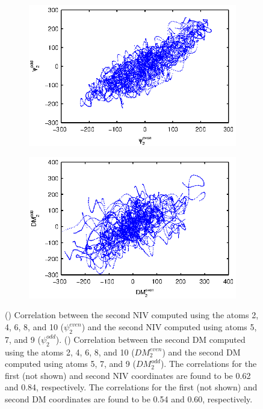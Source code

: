 \begin{figure}[t]
\centering
\begin{subfigure}{0.4\textwidth}
\includegraphics[width=\textwidth]{NLICA_corr}
\caption{}
\label{subfig:ala_corr1}
\end{subfigure}
\begin{subfigure}{0.4\textwidth}
\includegraphics[width=\textwidth]{DM_corr}
\caption{}
\label{subfig:ala_corr2}
\end{subfigure}
\caption[Comparison of intrinsic variable and diffusion maps embeddings for alanine dipeptide data]{() Correlation between the second NIV computed using the atoms 2, 4, 6, 8, and 10 ($\psi_2^{even}$) and the second NIV computed using atoms 5, 7, and 9 ($\psi_2^{odd}$).
    () Correlation between the second DM computed using the atoms 2, 4, 6, 8, and 10 ($DM_2^{even}$) and the second DM computed using atoms 5, 7, and 9 ($DM_2^{odd}$).
    The correlations for the first (not shown) and second NIV coordinates are found to be 0.62 and 0.84, respectively.
    The correlations for the first (not shown) and second DM coordinates are found to be 0.54 and 0.60, respectively. }
    \label{fig:ala_corr}
\end{figure}

